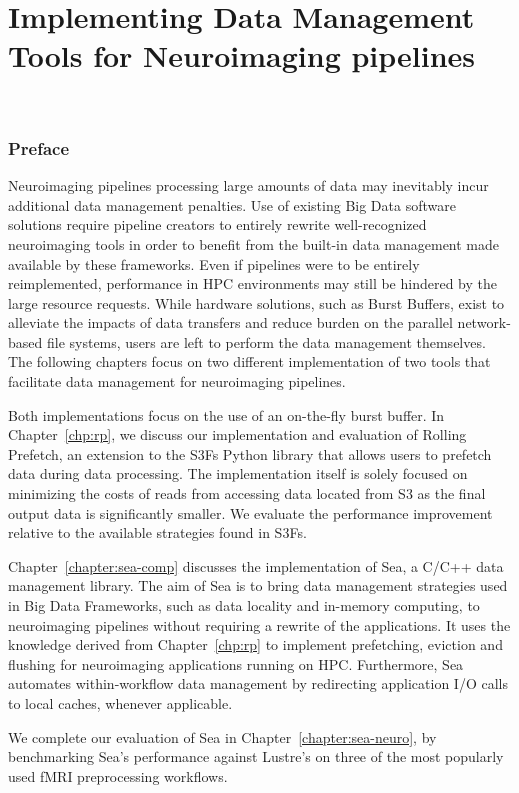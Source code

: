 \part{Implementing Data Management Tools for Neuroimaging pipelines}~\label{part:implementation}
\section*{Preface}

Neuroimaging pipelines processing large amounts of data may inevitably incur
additional data management penalties. Use of existing Big Data software
solutions require pipeline creators to entirely rewrite well-recognized
neuroimaging tools in order to benefit from the built-in data management made
available by these frameworks. Even if pipelines were to be entirely
reimplemented, performance in HPC environments may still be hindered by the
large resource requests. While hardware solutions, such as Burst Buffers, exist
to alleviate the impacts of data transfers and reduce burden on the parallel
network-based file systems, users are left to perform the data management
themselves. The following chapters focus on two different implementation of two
tools that facilitate data management for neuroimaging pipelines. 

Both implementations focus on the use of an on-the-fly burst buffer. In
Chapter~\ref{chp:rp}, we discuss our implementation and evaluation of Rolling
Prefetch, an extension to the S3Fs Python library that allows users to prefetch
data during data processing. The implementation itself is solely focused on
minimizing the costs of reads from accessing data located from S3 as the final
output data is significantly smaller. We evaluate the performance improvement
relative to the available strategies found in S3Fs. 

Chapter~\ref{chapter:sea-comp} discusses the implementation of Sea, a C/C++ data
management library. The aim of Sea is to bring data management strategies used
in Big Data Frameworks, such as data locality and in-memory computing, to
neuroimaging pipelines without requiring a rewrite of the applications. It uses
the knowledge derived from Chapter~\ref{chp:rp} to implement prefetching,
eviction and flushing for neuroimaging applications running on HPC. Furthermore,
Sea automates within-workflow data management by redirecting application I/O
calls to local caches, whenever applicable. 

We complete our evaluation of Sea in Chapter~\ref{chapter:sea-neuro}, by
benchmarking Sea's performance against Lustre's on three of the most
popularly used fMRI preprocessing workflows.

